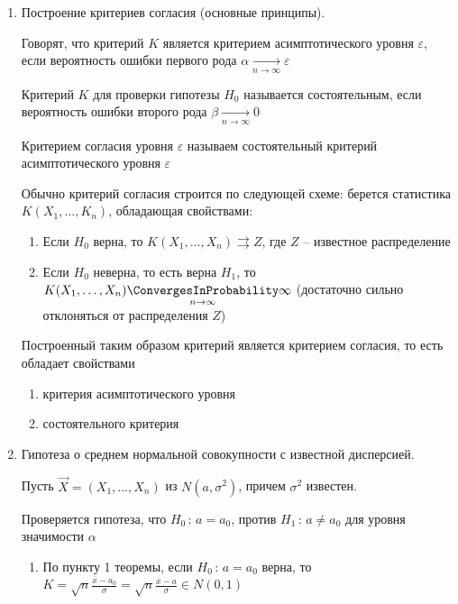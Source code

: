 \begin{enumerate}
    \item Построение критериев согласия (основные принципы).

    \Defs Говорят, что критерий $K$ является критерием асимптотического уровня $\varepsilon$, если 
    вероятность ошибки первого рода $\alpha \underset{n \to \infty}{\longrightarrow} \varepsilon$

    \Defs Критерий $K$ для проверки гипотезы $H_0$ называется состоятельным, если вероятность ошибки второго рода
    $\beta \underset{n \to \infty}{\longrightarrow} 0$

    \Defs Критерием согласия уровня $\varepsilon$ называем состоятельный критерий асимптотического уровня
    $\varepsilon$

    Обычно критерий согласия строится по следующей схеме: берется статистика $K(X_1, \dots, K_n)$, 
    обладающая свойствами:

    \begin{enumerate}
        \item Если $H_0$ верна, то $K(X_1, \dots, X_n) \rightrightarrows Z$, где $Z$ -- известное распределение

        \item Если $H_0$ неверна, то есть верна $H_1$, то $K(X_1, \dots, X_n) \underset{n \to \infty}{\ConvergesInProbability} \infty$ 
        (достаточно сильно отклоняться от распределения $Z$)
    \end{enumerate}

    \begin{MyTheorem}
        Построенный таким образом критерий является критерием согласия, то есть обладает свойствами

        \begin{enumerate}
            \item критерия асимптотического уровня
            \item состоятельного критерия
        \end{enumerate}
    \end{MyTheorem}


    \item Гипотеза о среднем нормальной совокупности с известной дисперсией.

    Пусть $\vec X = (X_1, \dots, X_n)$ из $N(a, \sigma^2)$, причем $\sigma^2$ известен.

    Проверяется гипотеза, что $H_0 \, : \, a = a_0$, против $H_1 \, : \, a \neq a_0$ для уровня значимости $\alpha$

    \begin{enumerate}
        \item По пункту 1 теоремы, если $H_0 \, : \, a = a_0$ верна, то $K = \sqrt{n} \frac{\overline{x} - a_0}{\sigma} = 
        \sqrt{n} \frac{\overline{x} - a}{\sigma} \in N(0, 1)$
        

\end{enumerate}
\end{enumerate}
